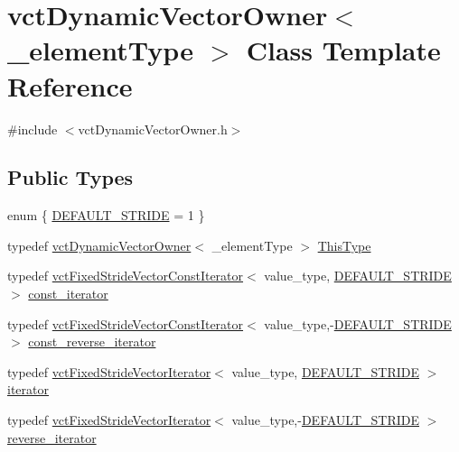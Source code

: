 \hypertarget{classvct_dynamic_vector_owner}{}\section{vct\+Dynamic\+Vector\+Owner$<$ \+\_\+element\+Type $>$ Class Template Reference}
\label{classvct_dynamic_vector_owner}


{\ttfamily \#include $<$vct\+Dynamic\+Vector\+Owner.\+h$>$}

\subsection*{Public Types}
\begin{DoxyCompactItemize}
\item 
enum \{ \hyperlink{classvct_dynamic_vector_owner_aa8a4c610d62931e2fa3374a05e4ae56ca4925b2613604288a5936bd34e22b6a9f}{D\+E\+F\+A\+U\+L\+T\+\_\+\+S\+T\+R\+I\+D\+E} = 1
 \}
\item 
typedef \hyperlink{classvct_dynamic_vector_owner}{vct\+Dynamic\+Vector\+Owner}$<$ \+\_\+element\+Type $>$ \hyperlink{classvct_dynamic_vector_owner_ad27e45098d2fe34a4650fca580526b18}{This\+Type}
\item 
typedef \hyperlink{classvct_fixed_stride_vector_const_iterator}{vct\+Fixed\+Stride\+Vector\+Const\+Iterator}$<$ value\+\_\+type, \hyperlink{classvct_dynamic_vector_owner_aa8a4c610d62931e2fa3374a05e4ae56ca4925b2613604288a5936bd34e22b6a9f}{D\+E\+F\+A\+U\+L\+T\+\_\+\+S\+T\+R\+I\+D\+E} $>$ \hyperlink{classvct_dynamic_vector_owner_a607608d191422c1d82168ffecd37c853}{const\+\_\+iterator}
\item 
typedef \hyperlink{classvct_fixed_stride_vector_const_iterator}{vct\+Fixed\+Stride\+Vector\+Const\+Iterator}$<$ value\+\_\+type,-\/\hyperlink{classvct_dynamic_vector_owner_aa8a4c610d62931e2fa3374a05e4ae56ca4925b2613604288a5936bd34e22b6a9f}{D\+E\+F\+A\+U\+L\+T\+\_\+\+S\+T\+R\+I\+D\+E} $>$ \hyperlink{classvct_dynamic_vector_owner_ab157dd93c9061bb74e4a5983606e200a}{const\+\_\+reverse\+\_\+iterator}
\item 
typedef \hyperlink{classvct_fixed_stride_vector_iterator}{vct\+Fixed\+Stride\+Vector\+Iterator}$<$ value\+\_\+type, \hyperlink{classvct_dynamic_vector_owner_aa8a4c610d62931e2fa3374a05e4ae56ca4925b2613604288a5936bd34e22b6a9f}{D\+E\+F\+A\+U\+L\+T\+\_\+\+S\+T\+R\+I\+D\+E} $>$ \hyperlink{classvct_dynamic_vector_owner_a0ef55f887d1340204d64f21d4db08fad}{iterator}
\item 
typedef \hyperlink{classvct_fixed_stride_vector_iterator}{vct\+Fixed\+Stride\+Vector\+Iterator}$<$ value\+\_\+type,-\/\hyperlink{classvct_dynamic_vector_owner_aa8a4c610d62931e2fa3374a05e4ae56ca4925b2613604288a5936bd34e22b6a9f}{D\+E\+F\+A\+U\+L\+T\+\_\+\+S\+T\+R\+I\+D\+E} $>$ \hyperlink{classvct_dynamic_vector_owner_a963d655b94fe07a9c7abbee2705005d1}{reverse\+\_\+iterator}
\end{DoxyCompactItemize}
